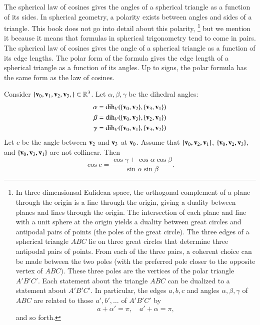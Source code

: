 The spherical law of cosines gives the angles of a spherical triangle
as a function of its sides.  In spherical geometry, a
polarity exists between angles and sides of a triangle.  This book does not
go into detail about this polarity,%
%
\footnote{In three dimensionsal Eulidean space, the orthogonal
  complement of a plane through the origin is a line through the
  origin, giving a duality between planes and lines through the
  origin.  The intersection of each plane and line with a unit sphere
  at the origin yields a duality between great circles and antipodal
  pairs of points (the poles of the great circle).  The three edges of
  a spherical triangle $ABC$ lie on three great circles that
  determine three antipodal pairs of points.  From each of the three
  pairs, a coherent choice can be made between the two poles (with the preferred pole closer to the opposite vertex of $ABC$).  These
  three poles are the vertices of the polar triangle $A'B'C'$.  Each
  statement about the triangle $ABC$ can be dualized to a statement
  about $A'B'C'$.  In particular, the edges $a,b,c$ and angles
  $\alpha,\beta,\gamma$ of $ABC$ are related to those $a',b',\ldots$
  of $A'B'C'$ by
\begin{displaymath}
a + \alpha' = \pi,\quad a' + \alpha= \pi,
\end{displaymath}
and so forth.
}  %
%
%
 but we mention it because it means that formulas in spherical
trigonometry tend to come in pairs.  The spherical law of cosines
gives the angle of a spherical triangle as a function of its edge
lengths.  The polar form of the formula gives the
edge length of a spherical triangle as a function of its angles.
Up to signs,
the polar formula has the same form as the law of cosines.
%

\begin{lemma}
\label{lemma:sloc2}  Consider 
  $\{{\mathbf v}_0,{\mathbf v}_1,{\mathbf v}_2,{\mathbf v}_3,\}\subset\mathbb{R}^3$.  Let
  $\alpha,\beta,\gamma$ be the dihedral angles:
\begin{align*}
\alpha &= \operatorname{dih}_V(\{{\mathbf v}_0,{\mathbf v}_2\},\{{\mathbf v}_3,{\mathbf v}_1\})\\
\beta &= \operatorname{dih}_V(\{{\mathbf v}_0,{\mathbf v}_3\},\{{\mathbf v}_2,{\mathbf v}_1\})\\
\gamma&= \operatorname{dih}_V(\{{\mathbf v}_0,{\mathbf v}_1\},\{{\mathbf v}_3,{\mathbf v}_2\})\\
\end{align*}
Let $c$ be the
angle between ${\mathbf v}_2$ and ${\mathbf v}_3$ at ${\mathbf v}_0$. 
Assume that $\{{\mathbf v}_0,{\mathbf v}_2,{\mathbf v}_1\}$, $\{{\mathbf v}_0,{\mathbf v}_2,{\mathbf v}_3\}$, and $\{{\mathbf v}_0,{\mathbf v}_3,{\mathbf v}_1\}$ are not collinear.
Then
\begin{displaymath}
\cos c = \frac{\cos \gamma + \cos \alpha \cos \beta}
{\sin \alpha\sin \beta}.
\end{displaymath}
\end{lemma}
%
%

